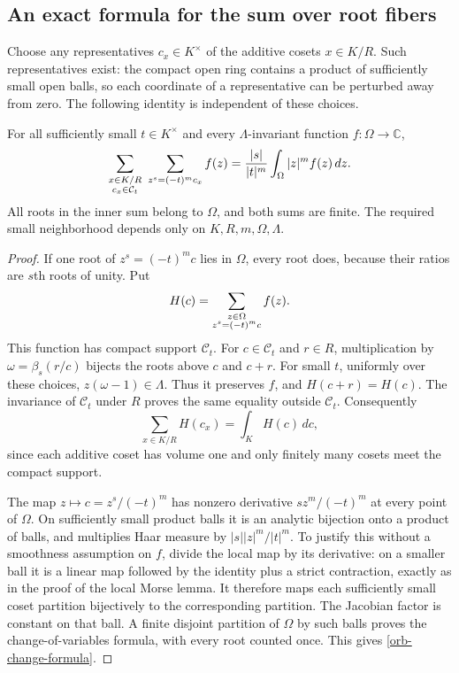 \subsection{An exact formula for the sum over root fibers}

Choose any representatives $c_x\in K^\times$ of the additive
cosets $x\in K/R$.  Such representatives exist: the compact open
ring contains a product of sufficiently small open balls, so each
coordinate of a representative can be perturbed away from zero.
The following identity is independent of these choices.

\begin{theorem}\label{orb-change-variable}
For all sufficiently small $t\in K^\times$ and every
$\Lambda$-invariant function $f:\Omega\to\mathbb C$,
\begin{equation}\label{orb-change-formula}
 \sum_{\substack{x\in K/R\cr c_x\in\mathcal C_t}}
       \ \sum_{z^s=(-t)^m c_x} f(z)
 =\frac{|s|}{|t|^m}\int_\Omega |z|^m f(z)\,dz.
\end{equation}
All roots in the inner sum belong to $\Omega$, and both sums are
finite.  The required small neighborhood depends only on
$K,R,m,\Omega,\Lambda$.
\end{theorem}

\begin{proof}
If one root of $z^s=(-t)^mc$ lies in $\Omega$, every root does,
because their ratios are $s$th roots of unity.  Put
\[
 H(c)=\sum_{\substack{z\in\Omega\cr z^s=(-t)^mc}}f(z).
\]
This function has compact support $\mathcal C_t$.  For
$c\in\mathcal C_t$ and $r\in R$, multiplication by
$\omega=\beta_s(r/c)$ bijects the roots above $c$ and $c+r$.
For small $t$, uniformly over these choices,
$z(\omega-1)\in\Lambda$.  Thus it preserves $f$, and
$H(c+r)=H(c)$.  The invariance of $\mathcal C_t$ under $R$
proves the same equality outside $\mathcal C_t$.  Consequently
\[
 \sum_{x\in K/R}H(c_x)=\int_K H(c)\,dc,
\]
since each additive coset has volume one and only finitely many
cosets meet the compact support.

The map $z\mapsto c=z^s/(-t)^m$ has nonzero derivative
$s z^m/(-t)^m$ at every point of $\Omega$.  On sufficiently small
product balls it is an analytic bijection onto a product of balls,
and multiplies Haar measure by $|s||z|^m/|t|^m$.  To justify this
without a smoothness assumption on $f$, divide the local map by
its derivative: on a smaller ball it is a linear map followed by
the identity plus a strict contraction, exactly as in the proof
of the local Morse lemma.  It therefore maps each sufficiently
small coset partition bijectively to the corresponding partition.
The Jacobian factor is constant on that ball.  A finite disjoint
partition of $\Omega$ by such balls proves the change-of-variables
formula, with every root counted once.  This gives
\eqref{orb-change-formula}.
\end{proof}

